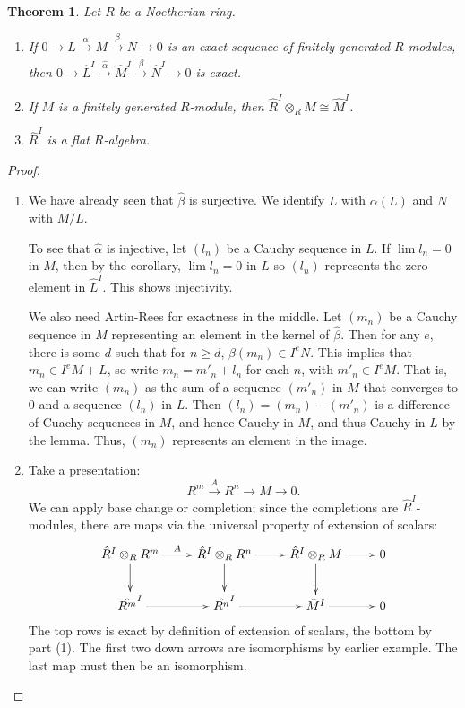 \documentclass{amsart}[12pt]
\numberwithin{equation}{section}
\theoremstyle{plain} %
\newtheorem{thm}[equation]{Theorem}
\theoremstyle{definition}
\theoremstyle{remark}
\newcommand{\xra}[1]{\xrightarrow{#1}}
\begin{document}
 
 \begin{thm} Let $R$ be a Noetherian ring.
 \begin{enumerate}
 \item If $0 \to L \xra{\alpha} M \xra{\beta} N \to 0$ is an exact sequence of finitely generated $R$-modules, then
 $0 \to \hat{L}^I \xra{\hat{\alpha}} \hat{M}^I \xra{\hat{\beta}} \hat{N}^I \to 0$ is exact.
 \item If $M$ is a finitely generated $R$-module, then $\hat{R}^I \otimes_R M \cong \hat{M}^I$.
 \item $\hat{R}^I$ is a flat $R$-algebra.
 \end{enumerate}
	\end{thm}
\begin{proof}
\begin{enumerate}
\item We have already seen that $\hat{\beta}$ is surjective. We identify $L$ with $\alpha(L)$ and $N$ with $M/L$.

To see that $\hat{\alpha}$ is injective, let $(l_n)$ be a Cauchy sequence in $L$. If $\lim l_n=0$ in $M$, then by the corollary, $\lim l_n = 0$ in $L$ so $(l_n)$ represents the zero element in $\hat{L}^I$. This shows injectivity.

We also need Artin-Rees for exactness in the middle. Let $(m_n)$ be a Cauchy sequence in $M$ representing an element in the kernel of $\hat{\beta}$. Then for any $e$, there is some $d$ such that for $n\geq d$, $\beta(m_n) \in  I^e N$. This implies that $m_n\in I^e M + L$, so write $m_n = m'_n + l_n$ for each $n$, with $m'_n\in I^e M$. That is, we can write $(m_n)$ as the sum of a sequence $(m'_n)$ in $M$ that converges to $0$ and a sequence $(l_n)$ in $L$. Then $(l_n) = (m_n) - (m'_n)$ is a difference of Cuachy sequences in $M$, and hence Cauchy in $M$, and thus Cauchy in $L$ by the lemma.  Thus, $(m_n)$ represents an element in the image.

\item Take a presentation:
\[ R^m \xra{A} R^n \to M \to 0.\]
We can apply base change or completion; since the completions are $\hat{R}^I$-modules, there are maps via the universal property of extension of scalars:
\[\xymatrix{ \hat{R}^I \otimes_R R^m \ar[r]^{A}\ar[d] &  \hat{R}^I \otimes_R R^n  \ar[d] \ar[r]& \hat{R}^I \otimes_R M \ar[r] \ar[d] & 0 \\
\hat{R^m}^I \ar[r] & \hat{R^n}^I \ar[r] & \hat{M}^I \ar[r] & 0}\]
The top rows is exact by definition of extension of scalars, the bottom by part (1).
The first two down arrows are isomorphisms by earlier example. The last map must then be an isomorphism.



\end{enumerate}
\end{proof}
\end{document}
